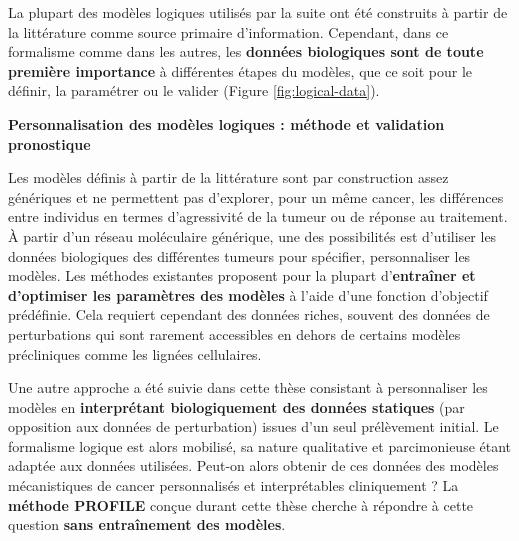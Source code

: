 \documentclass[a4paper,12pt,twoside,onecolumn,openright,final,oldfontcommands]{memoir}
\begin{document}
La plupart des modèles logiques utilisés par la suite ont été construits
à partir de la littérature comme source primaire d'information.
Cependant, dans ce formalisme comme dans les autres, les \textbf{données
biologiques sont de toute première importance} à différentes étapes du
modèles, que ce soit pour le définir, la paramétrer ou le valider
(Figure \ref{fig:logical-data}).

\textbf{Personnalisation des modèles logiques : méthode et validation
pronostique}

Les modèles définis à partir de la littérature sont par construction
assez génériques et ne permettent pas d'explorer, pour un même cancer,
les différences entre individus en termes d'agressivité de la tumeur ou
de réponse au traitement. À partir d'un réseau moléculaire générique,
une des possibilités est d'utiliser les données biologiques des
différentes tumeurs pour spécifier, personnaliser les modèles. Les
méthodes existantes proposent pour la plupart d'\textbf{entraîner et
d'optimiser les paramètres des modèles} à l'aide d'une fonction
d'objectif prédéfinie. Cela requiert cependant des données riches,
souvent des données de perturbations qui sont rarement accessibles en
dehors de certains modèles précliniques comme les lignées cellulaires.

Une autre approche a été suivie dans cette thèse consistant à
personnaliser les modèles en \textbf{interprétant biologiquement des
données statiques} (par opposition aux données de perturbation) issues
d'un seul prélèvement initial. Le formalisme logique est alors mobilisé,
sa nature qualitative et parcimonieuse étant adaptée aux données
utilisées. Peut-on alors obtenir de ces données des modèles
mécanistiques de cancer personnalisés et interprétables cliniquement ?
La \textbf{méthode PROFILE} conçue durant cette thèse cherche à répondre
à cette question \textbf{sans entraînement des modèles}.
\end{document}
